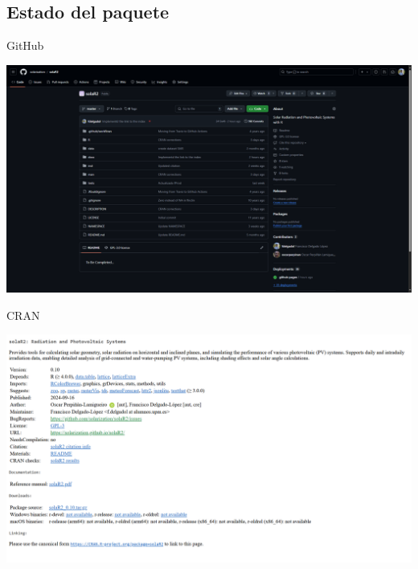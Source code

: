 \documentclass[aspectratio=169, usenames,svgnames,dvipsnames]{beamer}
\begin{document}
\subsection{Estado del paquete}
\label{sec:org3b3ee92}
\begin{frame}[label={sec:org5225da3}]{GitHub}
\begin{center}
\href{https://github.com/solarization/solaR2}{\includegraphics[width=.9\linewidth]{../figuras/GitHub.png}}
\end{center}
\end{frame}
\begin{frame}[label={sec:orgc0cafb9}]{CRAN}
\begin{center}
\href{https://cran.r-project.org/package=solaR2}{\includegraphics[width=.9\linewidth]{../figuras/CRAN.png}}
\end{center}
\end{frame}
\end{document}
